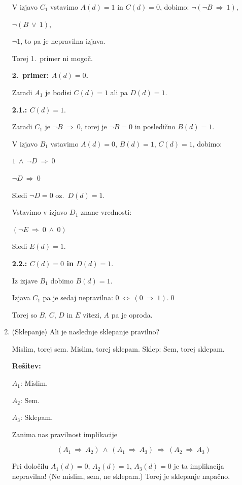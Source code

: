 \documentclass[11pt,paper=b5,footinclude,headinclude]{scrbook} %
\def\ali {{~\vee~}}
\def\inn {{~\wedge~}}
\def\sledi {{~\Rightarrow~}}
\def\cee {{~\Leftrightarrow~}}
\begin{document}
\begin{enumerate}
V izjavo $C_1$ vstavimo $A(d) = 1$ in $C(d) = 0$, dobimo:
$\neg(\neg B\sledi 1)$,

$\neg(B\ali 1)$,

$\neg 1$, to pa je nepravilna izjava.

Torej 1.~primer ni mogoč.
%
%
%
%
%
%

\textbf{2.~primer: $A(d) = 0$.}

Zaradi $A_1$ je bodisi $C(d) = 1$ ali pa $D(d) = 1$.

\textbf{2.1.: $C(d) = 1$}.

Zaradi $C_1$ je $\neg B \sledi 0$, torej je $\neg B = 0$ in posledično $B(d) = 1$.

V izjavo $B_1$ vstavimo $A(d) = 0$, $B(d) = 1$, $C(d) = 1$, dobimo:

$1 \inn \neg D\sledi 0$

$\neg D\sledi 0$

Sledi $\neg D = 0$ oz.~$D(d) = 1$.

Vstavimo v izjavo $D_1$ znane vrednosti:

$(\neg E \sledi 0 \inn 0)$

Sledi $E(d) = 1$.

\bigskip

\textbf{2.2.: $C(d) = 0$ in $D(d) = 1$}.

Iz izjave $B_1$ dobimo $B(d) = 1$.

Izjava $C_1$ pa je sedaj nepravilna:
$0 \cee (0\sledi 1)$.\qed

Torej so $B$, $C$, $D$ in $E$ vitezi, $A$ pa je oproda.


\bigskip
\item (Sklepanje)
Ali je naslednje sklepanje pravilno?

Mislim, torej sem. Mislim, torej sklepam. Sklep: Sem, torej sklepam.


\textbf{Rešitev:}

$A_1$: Mislim.

$A_2$: Sem.

$A_3$: Sklepam.

Zanima nas pravilnost implikacije

$$(A_1\sledi A_2)\inn(A_1\sledi A_3)\sledi(A_2\sledi A_3)$$

Pri določilu $A_1(d) = 0$, $A_2(d) = 1$, $A_3(d) = 0$ je ta implikacija nepravilna!
(Ne mislim, sem, ne sklepam.)
Torej je sklepanje napačno.


\end{enumerate}
\end{document}
